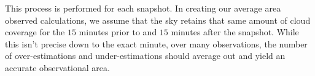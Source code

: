 This process is performed for each snapshot.
In creating our average area observed calculations, we assume that the sky retains that same amount of cloud coverage for the $15$ minutes prior to and $15$ minutes after the snapshot.
While this isn't precise down to the exact minute, over many observations, the number of over-estimations and under-estimations should average out and yield an accurate observational area.























 
